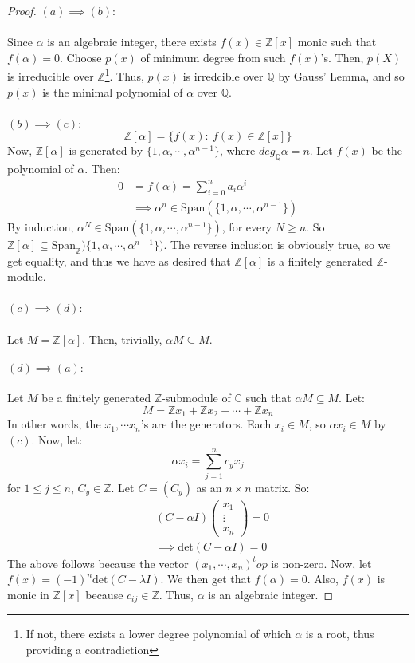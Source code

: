 \documentclass{article}
\newcommand{\C}{\mathbb{C}}
\newcommand{\Q}{\mathbb{Q}}
\newcommand{\Z}{\mathbb{Z}}
\begin{document}
\begin{proof}
$(a)\implies (b)$:\\
\\
Since $\alpha$ is an algebraic integer, there exists $f(x)\in\Z[x]$ monic such that $f(\alpha)=0$. Choose $p(x)$ of minimum degree from such $f(x)$'s. Then, $p(X)$ is irreducible over $\Z$\footnote{If not, there exists a lower degree polynomial of which $\alpha$ is a root, thus providing a contradiction}. Thus, $p(x)$ is irredcible over $\Q$ by Gauss' Lemma, and so $p(x)$ is the minimal polynomial of $\alpha$ over $\Q$. \\
\\
$(b)\implies (c)$:
$$\Z[\alpha]=\{f(x):\ f(x)\in\Z[x]\}$$
Now, $\Z[\alpha]$ is generated by $\{1,\alpha,\cdots,\alpha^{n-1}\}$, where $deg_\Q\alpha = n$. Let $f(x)$ be the polynomial of $\alpha$. Then:
\begin{align*}
    0 &= f(\alpha)=\displaystyle\sum_{i=0}^n a_i\alpha^i\\
    &\implies \alpha^n\in \text{Span}(\{1,\alpha,\cdots, \alpha^{n-1}\})
\end{align*}
By induction, $\alpha^N\in \text{Span}(\{1,\alpha,\cdots, \alpha^{n-1}\})$, for every $N\geq n$. So $\Z[\alpha]\subseteq \text{Span}_\Z)\{1,\alpha,\cdots, \alpha^{n-1}\})$. The reverse inclusion is obviously true, so we get equality, and thus we have as desired that $\Z[\alpha]$ is a finitely generated $\Z$-module.\\
\\
$(c)\implies (d)$:\\
\\
Let $M=\Z[\alpha]$. Then, trivially, $\alpha M\subseteq M$.\\
\\
$(d)\implies (a):$\\
\\
Let $M$ be a finitely generated $\Z$-submodule of $\C$ such that $\alpha M\subseteq M$. Let:
$$M=\Z x_1+\Z x_2+\cdots + \Z x_n$$
In other words, the $x_1,\cdots x_n$'s are the generators. Each $x_i\in M$, so $\alpha x_i\in M$ by $(c)$. Now, let:
$$\alpha x_i = \displaystyle\sum_{j=1}^n c_yx_j$$
for $1\leq j\leq n$, $C_y\in \Z$. Let $C=(C_y)$ as an $n\times n$ matrix. So:
\begin{align*}
    &(C-\alpha I)\begin{pmatrix} x_1\\ \vdots \\ x_n\end{pmatrix}=0\\
    &\implies \text{det}(C-\alpha I)=0
\end{align*}
The above follows because the vector $(x_1,\cdots, x_n)^top$ is non-zero. Now, let $f(x)=(-1)^n \text{det}(C-\lambda I)$. We then get that $f(\alpha)=0$. Also, $f(x)$ is monic in $\Z[x]$ because $c_{ij}\in\Z$. Thus, $\alpha$ is an algebraic integer.
\end{proof}
\end{document}
